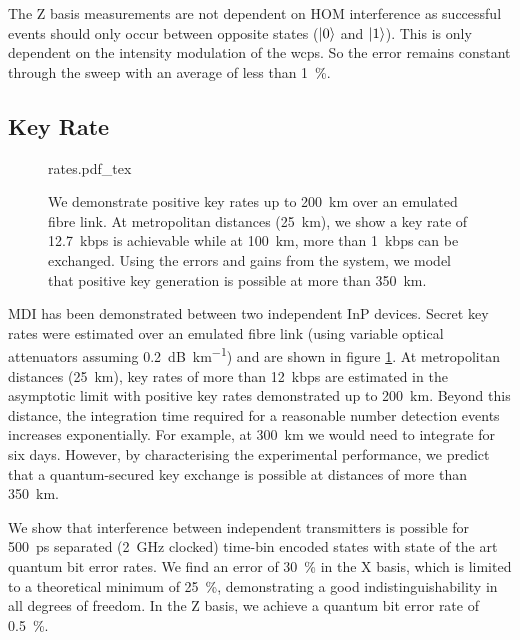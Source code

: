 The Z basis measurements are not dependent on \ac{HOM} interference as successful events should only occur between opposite states ($\ket{0}$ and $\ket{1}$). This is only dependent on the intensity modulation of the \acp{wcp}. So the error remains constant through the sweep with an average of less than \SI{1}{\percent}.

%

\subsection{Key Rate}

\begin{figure}[tbp]
	\centering
	\small
	\def\svgwidth{0.9\textwidth} 
	{rates.pdf_tex}
	\caption[Asymptotic key rates of chip-based MDI-QKD]{We demonstrate positive key rates up to \SI{200}{\km} over an emulated fibre link. At metropolitan distances (\SI{25}{\km}), we show a key rate of \SI{12.7}{kbps} is achievable while at \SI{100}{\km}, more than \SI{1}{kbps} can be exchanged. Using the errors and gains from the system, we model that positive key generation is possible at more than \SI{350}{\km}.}
	\label{fig:mdi_rates}
\end{figure}

\Ac{MDI} has been demonstrated between two independent InP devices. Secret key rates were estimated over an emulated fibre link (using variable optical attenuators assuming \SI{0.2}{dB\per\km}) and are shown in figure \ref{fig:mdi_rates}. At metropolitan distances (\SI{25}{\km}), key rates of more than \SI{12}{kbps} are estimated in the asymptotic limit with positive key rates demonstrated up to \SI{200}{\km}. Beyond this distance, the integration time required for a reasonable number detection events increases exponentially. For example, at \SI{300}{\km} we would need to integrate for six days. However, by characterising the experimental performance, we predict that a quantum-secured key exchange is possible at distances of more than \SI{350}{\km}. 

We show that interference between independent transmitters is possible for \SI{500}{ps} separated (\SI{2}{GHz} clocked) time-bin encoded states with state of the art quantum bit error rates. We find an error of \SI{30}{\percent} in the X basis, which is limited to a theoretical minimum of \SI{25}{\percent}, demonstrating a good indistinguishability in all degrees of freedom. In the Z basis, we achieve a quantum bit error rate of \SI{0.5}{\percent}. 

